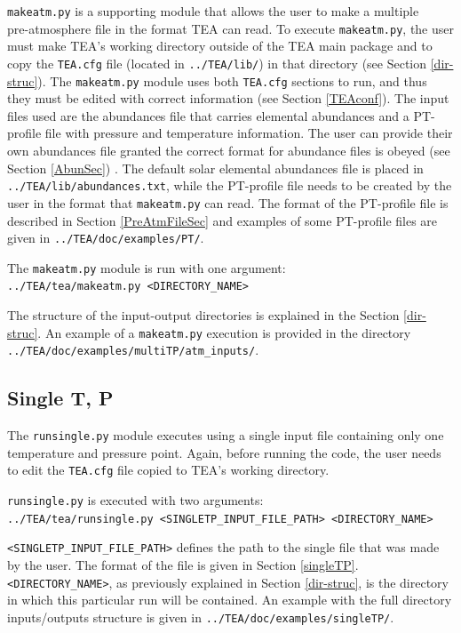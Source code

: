 {\texttt{makeatm.py} is a supporting module that allows the user to
make a multiple  \\ pre-atmosphere file in the format TEA
can read. To execute \texttt{makeatm.py}, the user must make TEA's
working directory outside of the TEA main package and to copy
the \texttt{TEA.cfg} file (located in \texttt{../TEA/lib/}) in that
directory (see Section \ref{dir-struc}). The \texttt{makeatm.py}
module uses both \texttt{TEA.cfg} sections to run, and thus they must
be edited with correct information (see Section \ref{TEAconf}). The
input files used are the abundances file that carries elemental
abundances and a PT-profile file with pressure and temperature
information. The user can provide their own abundances file granted
the correct format for abundance files is obeyed (see
Section \ref{AbunSec}) . The default solar elemental abundances file
is placed in \texttt{../TEA/lib/abundances.txt}, while the PT-profile
file needs to be created by the user in the format that
\texttt{makeatm.py} can read. The format of the PT-profile file is
described in Section \ref{PreAtmFileSec} and examples of some
PT-profile files are given in \texttt{../TEA/doc/examples/PT/}.

The \texttt{makeatm.py} module is run with one argument:\\
\texttt{../TEA/tea/makeatm.py <DIRECTORY\_NAME>}

The structure of the input-output directories is explained in the
Section \ref{dir-struc}. An example of a \texttt{makeatm.py} execution is
provided in the directory 
\newline \texttt{../TEA/doc/examples/multiTP/atm\_inputs/}.

\subsection{Single T, P}
\label{exec-single}

The \texttt{runsingle.py} module executes using a single 
input file containing only one temperature and pressure point. Again,
before running the code, the user needs to edit the \texttt{TEA.cfg}
file copied to TEA's working directory.

\texttt{runsingle.py} is executed with two arguments:
\\ \texttt{../TEA/tea/runsingle.py <SINGLETP\_INPUT\_FILE\_PATH>
  <DIRECTORY\_NAME>}

\texttt{<SINGLETP\_INPUT\_FILE\_PATH>} defines the path to the single
 file that was made by the user. The format of the file
is given in Section
\ref{singleTP}. \texttt{<DIRECTORY\_NAME>}, as previously
explained in Section \ref{dir-struc}, is the directory in which this
particular run will be contained. An example with the full directory
inputs/outputs structure is given in \newline
\texttt{../TEA/doc/examples/singleTP/}.

}
